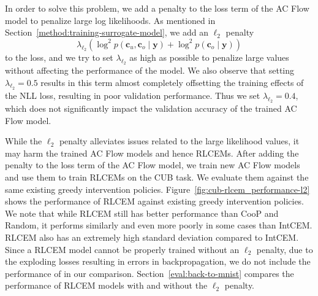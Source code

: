 
In order to solve this problem, we add a penalty 
to the loss term of the AC Flow model to penalize
large log likelihoods. As mentioned in Section~\ref{method:training-surrogate-model},
we add an $\ell_2$ penalty
\[\lambda_{\ell_2} \left ( \log^2 p(\mathbf{c}_u, \mathbf{c}_o \mid \mathbf{y}) + 
\log^2 p(\mathbf{c}_o \mid \mathbf{y}) \right )\]
to the loss, and we try to set $\lambda_{\ell_2}$ 
as high as possible to penalize large values without affecting the performance of the model.
We also observe that setting $\lambda_{\ell_2} = 0.5$ results 
in this term almost completely offsetting the training 
effects of the NLL loss, resulting in 
poor validation performance. Thus we set $\lambda_{\ell_2} = 0.4$,
which does not significantly impact the validation accuracy of the trained AC Flow model.

While the $\ell_2$ penalty 
alleviates issues related to the large likelihood values, it may harm the trained AC Flow models and hence RLCEMs.
After adding the penalty to the loss term of the AC Flow model, we train new AC Flow models 
and use them to train RLCEMs on the CUB task. 
We evaluate them against 
the same existing greedy intervention policies. Figure~\ref{fig:cub-rlcem_performance-l2}
shows the performance of RLCEM against existing greedy intervention policies.
We note that while RLCEM still has better performance than CooP and Random,
it performs similarly and even more poorly in some cases than IntCEM.
RLCEM also has an extremely high standard deviation compared to IntCEM.
Since a RLCEM model cannot be properly trained without
an $\ell_2$ penalty,
due to the exploding losses resulting in errors in backpropagation,
we do not include the performance of in our comparison. Section~\ref{eval:back-to-mnist} compares the performance of RLCEM models with and without the $\ell_2$ penalty.

